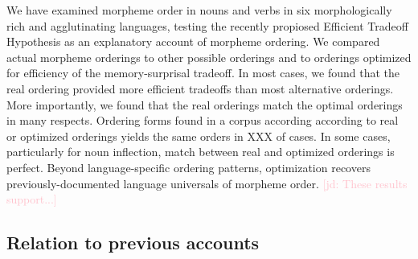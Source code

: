 \documentclass[11pt,letterpaper]{article}
\newcommand{\citep}{\parencite}
\newcommand\becky[1]{{\color{blue}(#1)}}
\newcommand{\jd}[1]{\textcolor{Pink}{[jd: #1]}}
\begin{document}
We have examined morpheme order in nouns and verbs in six morphologically rich and agglutinating languages, testing the recently propiosed Efficient Tradeoff Hypothesis \citep{hahn2020modeling} as an explanatory account of morpheme ordering.
We compared actual morpheme orderings to other possible orderings and to orderings optimized for efficiency of the memory-surprisal tradeoff.
In most cases, we found that the real ordering provided more efficient tradeoffs than most alternative orderings.
More importantly, we found that the real orderings match the optimal orderings in many respects.
Ordering forms found in a corpus according according to real or optimized orderings yields the same orders in XXX of cases.
In some cases, particularly for noun inflection, match between real and optimized orderings is perfect.
Beyond language-specific ordering patterns, optimization recovers previously-documented language universals of morpheme order. \jd{These results support...}

\subsection{Relation to previous accounts}




\end{document}
